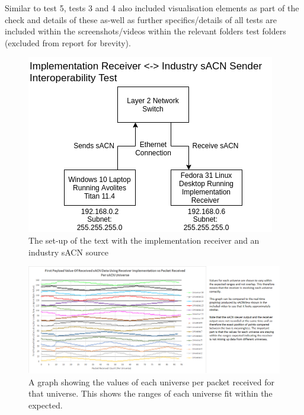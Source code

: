 \documentclass[11pt,a4paper]{report}
\begin{document}
Similar to test 5, tests 3 and 4 also included visualisation elements as part of the check and details of these as-well as further specifics/details of all tests are included within the screenshots/videos within the relevant folders test folders (excluded from report for brevity).\\

\begin{figure}[H]
	\label{AVO_SETUP}
	\includegraphics[width=\textwidth]{CS4099-Avo-setup.png}
	\caption{The set-up of the text with the implementation receiver and an industry sACN source}
\end{figure}

\begin{figure}[H]
	\label{RCV_INTEROP_TEST_5_GRAPH}
	\includegraphics[width=\textwidth]{test-5-processed-first-value-chart}
	\caption{A graph showing the values of each universe per packet received for that universe. This shows the ranges of each universe fit within the expected.}
\end{figure}
\end{document}
